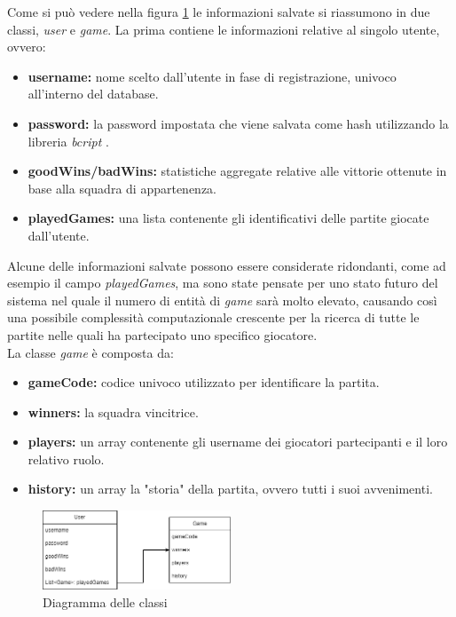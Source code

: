 Come si può vedere nella figura \ref{fig:dbClasses} le informazioni salvate si riassumono in due classi, \emph{user} e \emph{game}. La prima contiene le informazioni relative al singolo utente, ovvero:
\begin{itemize}
    \item \textbf{username:} nome scelto dall'utente in fase di registrazione, univoco all'interno del database.
    \item \textbf{password:} la password impostata che viene salvata come hash utilizzando la libreria \emph{bcript} \cite{bcryptWikipedia}.
    \item \textbf{goodWins/badWins:} statistiche aggregate relative alle vittorie ottenute in base alla squadra di appartenenza.
    \item \textbf{playedGames:} una lista contenente gli identificativi delle partite giocate dall'utente.
\end{itemize}
Alcune delle informazioni salvate possono essere considerate ridondanti, come ad esempio il campo \emph{playedGames}, ma sono state pensate per uno stato futuro del sistema nel quale il numero di entità di \emph{game} sarà molto elevato, causando così una possibile complessità computazionale crescente per la ricerca di tutte le partite nelle quali ha partecipato uno specifico giocatore.\\
La classe \emph{game} è composta da:
\begin{itemize}
    \item \textbf{gameCode:} codice univoco utilizzato per identificare la partita.
    \item \textbf{winners:} la squadra vincitrice.
    \item \textbf{players:} un array contenente gli username dei giocatori partecipanti e il loro relativo ruolo.
    \item \textbf{history:} un array la "storia" della partita, ovvero tutti i suoi avvenimenti.
\end{itemize}

\begin{figure}[H]
\centering
\includegraphics[width=0.5\textwidth]{img/draw/uml_db.png}
\caption{Diagramma delle classi}
\label{fig:dbClasses}
\end{figure}

